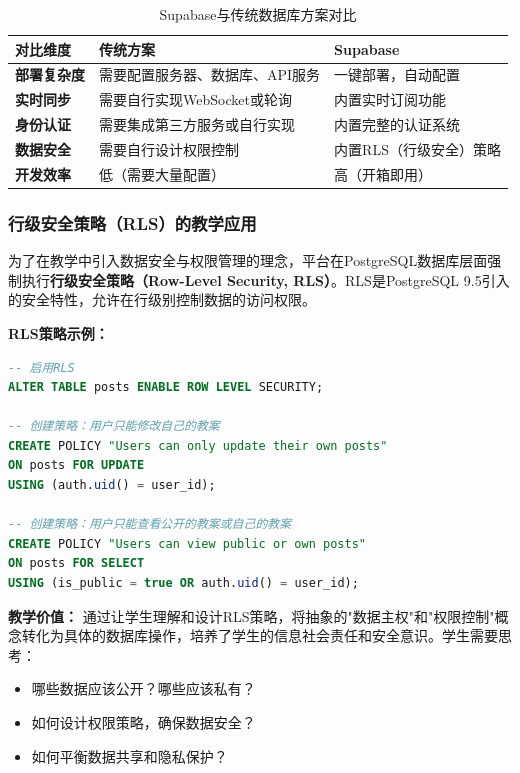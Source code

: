 \documentclass[12pt,a4paper,fontset=fandol]{ctexart}
\begin{document}
\begin{table}[H]
    \centering
    \caption{Supabase与传统数据库方案对比}
    \label{tab:supabase-comparison}
    \begin{tabular}{p{2.5cm}p{4cm}p{4cm}}
        \toprule
        \textbf{对比维度} & \textbf{传统方案} & \textbf{Supabase} \\
        \midrule
        \textbf{部署复杂度} & 需要配置服务器、数据库、API服务 & 一键部署，自动配置 \\
        \midrule
        \textbf{实时同步} & 需要自行实现WebSocket或轮询 & 内置实时订阅功能 \\
        \midrule
        \textbf{身份认证} & 需要集成第三方服务或自行实现 & 内置完整的认证系统 \\
        \midrule
        \textbf{数据安全} & 需要自行设计权限控制 & 内置RLS（行级安全）策略 \\
        \midrule
        \textbf{开发效率} & 低（需要大量配置） & 高（开箱即用） \\
        \bottomrule
    \end{tabular}
\end{table}

\subsubsection{行级安全策略（RLS）的教学应用}
为了在教学中引入数据安全与权限管理的理念，平台在PostgreSQL数据库层面强制执行\textbf{行级安全策略（Row-Level Security, RLS）}。RLS是PostgreSQL 9.5引入的安全特性，允许在行级别控制数据的访问权限\cite{postgresql2024}。

\textbf{RLS策略示例：}
\begin{lstlisting}[language=SQL, caption=Supabase RLS策略示例：确保用户只能修改自己的教案]
-- 启用RLS
ALTER TABLE posts ENABLE ROW LEVEL SECURITY;

-- 创建策略：用户只能修改自己的教案
CREATE POLICY "Users can only update their own posts"
ON posts FOR UPDATE 
USING (auth.uid() = user_id);

-- 创建策略：用户只能查看公开的教案或自己的教案
CREATE POLICY "Users can view public or own posts"
ON posts FOR SELECT 
USING (is_public = true OR auth.uid() = user_id);
\end{lstlisting}

\textbf{教学价值：}
通过让学生理解和设计RLS策略，将抽象的"数据主权"和"权限控制"概念转化为具体的数据库操作，培养了学生的信息社会责任和安全意识。学生需要思考：
\begin{itemize}
    \item 哪些数据应该公开？哪些应该私有？
    \item 如何设计权限策略，确保数据安全？
    \item 如何平衡数据共享和隐私保护？
\end{itemize}
\end{document}
